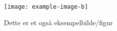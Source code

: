 \begin{figure}
    \centering
    \texttt{[image: example-image-b]}
    \caption{Dette er et også eksempelbilde/figur}
    \label{fig:yesd}
\end{figure}
